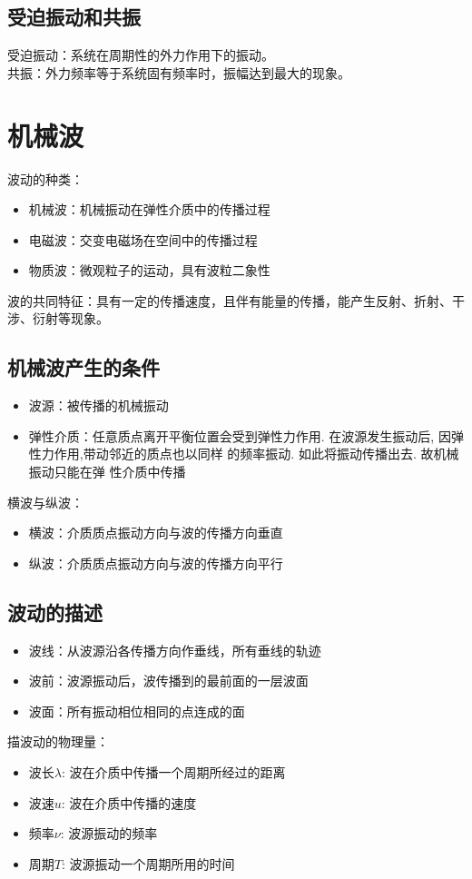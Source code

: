\documentclass[12pt, a4paper, oneside]{ctexbook}
\begin{document}
\subsection{受迫振动和共振}
受迫振动：系统在周期性的外力作用下的振动。\\
共振：外力频率等于系统固有频率时，振幅达到最大的现象。

\section{机械波}
波动的种类：
\begin{itemize}
    \item 机械波：机械振动在弹性介质中的传播过程
    \item 电磁波：交变电磁场在空间中的传播过程
    \item 物质波：微观粒子的运动，具有波粒二象性
\end{itemize}
波的共同特征：具有一定的传播速度，且伴有能量的传播，能产生反射、折射、干涉、衍射等现象。
\subsection{机械波产生的条件}
\begin{itemize}
    \item 波源：被传播的机械振动
    \item 弹性介质：任意质点离开平衡位置会受到弹性力作用. 在波源发生振动后, 因弹性力作用,带动邻近的质点也以同样 的频率振动. 如此将振动传播出去. 故机械振动只能在弹 性介质中传播
\end{itemize}
横波与纵波：
\begin{itemize}
    \item 横波：介质质点振动方向与波的传播方向垂直
    \item 纵波：介质质点振动方向与波的传播方向平行
\end{itemize}

\subsection{波动的描述}
\begin{itemize}
    \item 波线：从波源沿各传播方向作垂线，所有垂线的轨迹
    \item 波前：波源振动后，波传播到的最前面的一层波面
    \item 波面：所有振动相位相同的点连成的面
\end{itemize}
描波动的物理量：
\begin{itemize}
    \item 波长$\lambda$: 波在介质中传播一个周期所经过的距离
    \item 波速$u$: 波在介质中传播的速度
    \item 频率$\nu$: 波源振动的频率
    \item 周期$T$: 波源振动一个周期所用的时间
\end{itemize}
\end{document}
